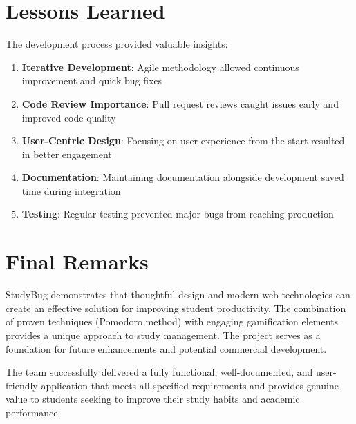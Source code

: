 \section{Lessons Learned}
The development process provided valuable insights:
\begin{enumerate}
    \item \textbf{Iterative Development}: Agile methodology allowed continuous improvement and quick bug fixes
    \item \textbf{Code Review Importance}: Pull request reviews caught issues early and improved code quality
    \item \textbf{User-Centric Design}: Focusing on user experience from the start resulted in better engagement
    \item \textbf{Documentation}: Maintaining documentation alongside development saved time during integration
    \item \textbf{Testing}: Regular testing prevented major bugs from reaching production
\end{enumerate}

\section{Final Remarks}
StudyBug demonstrates that thoughtful design and modern web technologies can create an effective solution for improving student productivity. The combination of proven techniques (Pomodoro method) with engaging gamification elements provides a unique approach to study management. The project serves as a foundation for future enhancements and potential commercial development.

The team successfully delivered a fully functional, well-documented, and user-friendly application that meets all specified requirements and provides genuine value to students seeking to improve their study habits and academic performance.
